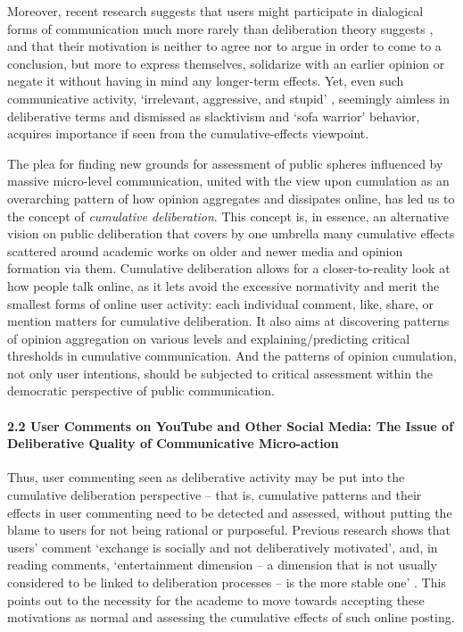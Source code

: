 Moreover, recent research suggests that users might participate in dialogical forms of communication much more rarely than deliberation theory suggests \cite{BodrunovaLitvinenkoBlekanov2021}, and that their motivation is neither to agree nor to argue in order to come to a conclusion, but more to express themselves, solidarize with an earlier opinion or negate it without having in mind any longer-term effects. Yet, even such communicative activity, ‘irrelevant, aggressive, and stupid’ \cite[p.~659]{SchultesDornerLehner}, seemingly aimless in deliberative terms and dismissed as slacktivism \cite{Morozov} and ‘sofa warrior’ behavior, acquires importance if seen from the cumulative-effects viewpoint.

The plea for finding new grounds for assessment of public spheres influenced by massive micro-level communication, united with the view upon cumulation as an overarching pattern of how opinion aggregates and dissipates online, has led us to the concept of \textit{cumulative deliberation}. This concept is, in essence, an alternative vision on public deliberation that covers by one umbrella many cumulative effects scattered around academic works on older and newer media and opinion formation via them. Cumulative deliberation allows for a closer-to-reality look at how people talk online, as it lets avoid the excessive normativity and merit the smallest forms of online user activity: each individual comment, like, share, or mention matters for cumulative deliberation. It also aims at discovering patterns of opinion aggregation on various levels and explaining/predicting critical thresholds in cumulative communication. And the patterns of opinion cumulation, not only user intentions, should be subjected to critical assessment within the democratic perspective of public communication.

\paragraph{2.2 User Comments on YouTube and Other Social Media: The Issue of Deliberative Quality of Communicative Micro-action}

Thus, user commenting seen as deliberative activity may be put into the cumulative deliberation perspective -- that is, cumulative patterns and their effects in user commenting need to be detected and assessed, without putting the blame to users for not being rational or purposeful. Previous research shows that users’ comment ‘exchange is socially and not deliberatively motivated’, and, in reading comments, ‘entertainment dimension -- a dimension that is not usually considered to be linked to deliberation processes -- is the more stable one’ \cite[p.~798]{SpringerEngelmannPfaffinger}. This points out to the necessity for the academe to move towards accepting these motivations as normal and assessing the cumulative effects of such online posting.

